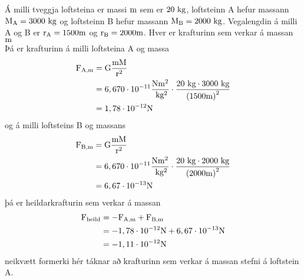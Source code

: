 \begin{formalexample}
Á milli tveggja loftsteina er massi $\textrm{m}$ sem er $20 \textrm{ k}\textrm{g}$, loftsteinn
A hefur massann $\textrm{M}_\text{A} = 3000 \textrm{ k}\textrm{g}$ og loftsteinn B hefur massann
$\textrm{M}_\text{B} = 2000 \textrm{ k}\textrm{g}$. Vegalengdin á milli A og B er 
$\textrm{r}_\text{A} = 1500 \textrm{m}$ og $\textrm{r}_\text{B} = 2000 \textrm{m}$.
Hver er krafturinn sem verkar á massan $\textrm{m}$
\\[4 ex]
Þá er krafturinn á milli loftsteina A og massa
\begin{align*}
	\textrm{F}_\text{A,m} &= \text{G} \frac{\textrm{m} \textrm{M}}{\textrm{r}^2} \\
		&= 6,670 \cdot 10^{-11} \frac{\textrm{N} \textrm{m}^2}{\textrm{ k}\textrm{g}^2} \cdot \frac{ 20 \textrm{ k}\textrm{g} \cdot 3000 \textrm{ k}\textrm{g}}{\left( 1500\textrm{m} \right)^2} \\
		&= 1,78 \cdot 10^{-12} \textrm{N}
\end{align*}
og á milli loftsteins B og massans
\begin{align*}
	\textrm{F}_\text{B,m} &= \text{G} \frac{\textrm{m} \textrm{M}}{\textrm{r}^2} \\
		&= 6,670 \cdot 10^{-11} \frac{\textrm{N} \textrm{m}^2}{\textrm{ k}\textrm{g}^2} \cdot \frac{ 20 \textrm{ k}\textrm{g} \cdot 2000 \textrm{ k}\textrm{g}}{\left( 2000\textrm{m} \right)^2} \\
		&= 6,67 \cdot 10^{-13} \textrm{N}
\end{align*}
þá er heildarkrafturin sem verkar á massan
\begin{align*}
	\textrm{F}_\text{heild} &= -\textrm{F}_\text{A,m} + \textrm{F}_\text{B,m} \\
		&= -1,78 \cdot 10^{-12} \textrm{N} + 6,67 \cdot 10^{-13} \textrm{N} \\
		&= -1,11 \cdot 10^{-12} \textrm{N}
\end{align*}
neikvætt formerki hér táknar að krafturinn sem verkar á massan stefni á loftstein A.
\end{formalexample}
